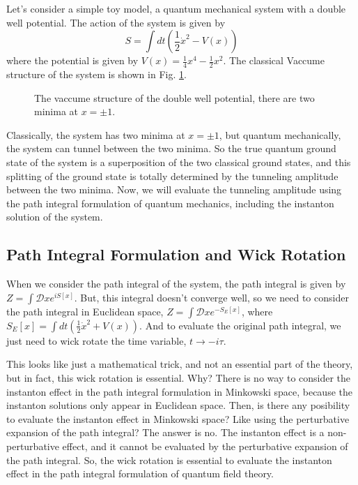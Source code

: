 \documentclass{article}
\begin{document}
Let's consider a simple toy model, a quantum mechanical system with a double well potential. The action of the system is given by
\begin{equation}
    S = \int dt \left( \frac{1}{2} \dot{x}^2 - V(x) \right)
\end{equation}
where the potential is given by $V(x) = \frac{1}{4}x^4 - \frac{1}{2}x^2$.
The classical Vaccume structure of the system is shown in Fig. \ref{fig:doublewell}.
\begin{figure}[h]
    \centering
    \caption{The vaccume structure of the double well potential, there are two minima at $x = \pm 1$.}
    \label{fig:doublewell}
\end{figure}

Classically, the system has two minima at $x = \pm 1$, but quantum mechanically, the system can tunnel between the two minima.
So the true quantum ground state of the system is a superposition of the two classical ground states, and this splitting of the ground state is totally determined by the tunneling amplitude between the two minima.
Now, we will evaluate the tunneling amplitude using the path integral formulation of quantum mechanics, including the instanton solution of the system. 




\subsection{Path Integral Formulation and Wick Rotation}


When we consider the path integral of the system, the path integral is given by $Z = \int \mathcal{D}x e^{iS[x]}$.
But, this integral doesn't converge well, so we need to consider the path integral in Euclidean space, $Z = \int \mathcal{D}x e^{-S_E[x]}$, where $S_E[x] = \int dt \left( \frac{1}{2} \dot{x}^2 + V(x) \right)$.
And to evaluate the original path integral, we just need to wick rotate the time variable, $t \rightarrow -i\tau$.

This looks like just a mathematical trick, and not an essential part of the theory, but in fact, this wick rotation is essential.
Why? There is no way to consider the instanton effect in the path integral formulation in Minkowski space, because the instanton solutions only appear in Euclidean space.
Then, is there any posibility to evaluate the instanton effect in Minkowski space? Like using the perturbative expansion of the path integral? The answer is no. The instanton effect is a non-perturbative effect, and it cannot be evaluated by the perturbative expansion of the path integral.
So, the wick rotation is essential to evaluate the instanton effect in the path integral formulation of quantum field theory.
\end{document}
